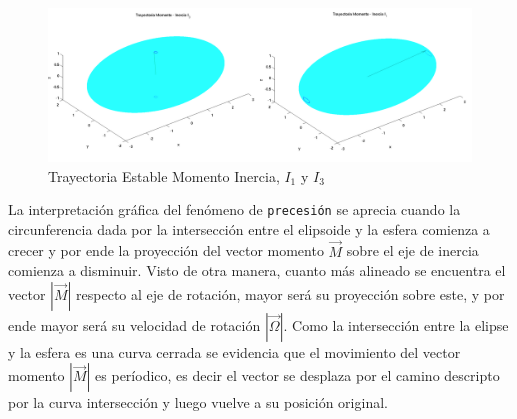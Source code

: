 \documentclass[oneside,a4paper,english,links]{amca}
\begin{document}


\begin{figure}[H]
\centering
\includegraphics[width=17cm]{Figuras/inercias_estables_I1_I3.png}
\caption{Trayectoria Estable Momento Inercia, $I_1$ y $I_3$}
\label{fig:cinemat_Trayectoria_Momento_inercias_estables_I1_I3}
\end{figure}

La interpretaci\'on gr\'afica del fen\'omeno de \texttt{precesi\'on} se aprecia cuando la circunferencia dada por la intersecci\'on entre el elipsoide y la esfera comienza a crecer y por ende la proyecci\'on del vector momento $\vec{M}$ sobre el eje de inercia  comienza a disminuir. Visto de otra manera, cuanto m\'as alineado se encuentra el vector $|\vec{M}|$ respecto al eje de rotaci\'on, mayor ser\'a su proyecci\'on sobre este, y por ende mayor ser\'a su velocidad de rotaci\'on $|\vec{\Omega}|$. Como la intersecci\'on entre la elipse y la esfera es una curva cerrada se evidencia que el movimiento del vector momento $|\vec{M}|$ es per\'iodico, es decir el vector se desplaza por el camino descripto por la curva intersecci\'on y luego vuelve a su posici\'on original.
\end{document}
